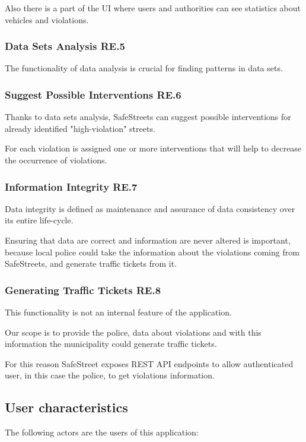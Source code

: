 Also there is a part of the UI where users and authorities can see statistics about vehicles and violations.

\subsubsection{Data Sets Analysis RE.5}
The functionality of data analysis is crucial for finding patterns in data sets.

\subsubsection{Suggest Possible Interventions RE.6}
Thanks to data sets analysis, SafeStreets can suggest possible interventions for already identified "high-violation" streets.

For each violation is assigned one or more interventions that will help to decrease the occurrence of violations.


\subsubsection{Information Integrity RE.7}
Data integrity is defined as maintenance and assurance of data consistency over its entire life-cycle.

Ensuring that data are correct and information are never altered is important, because local police could take the information about the violations coming from SafeStreets, and generate traffic tickets from it.

\subsubsection{Generating Traffic Tickets RE.8}
This functionality is not an internal feature of the application. 

Our scope is to provide the police, data about violations and with this information the municipality could generate traffic tickets.

For this reason SafeStreet exposes REST API endpoints to allow authenticated user, in this case the police, to get violations information.


\subsection{User characteristics}

The following actors are the users of this application:

